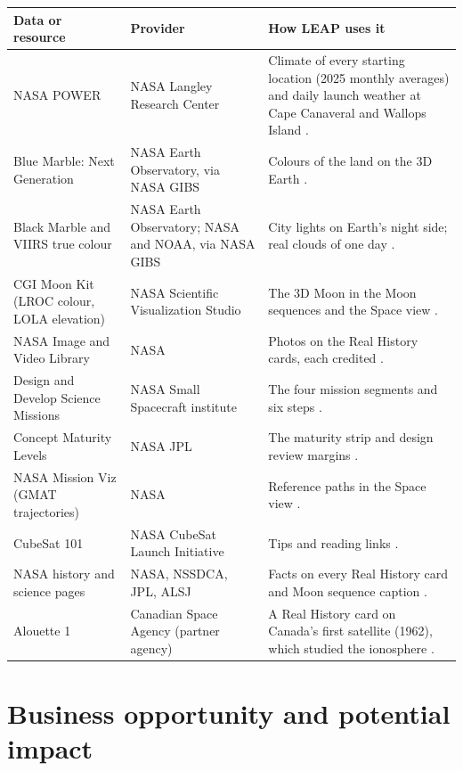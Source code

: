\documentclass[11pt,a4paper]{article}
\begin{document}
\begin{table}[H]
\centering\small
\begin{tabularx}{\textwidth}{@{}p{3.6cm} L L@{}}
\toprule
\textbf{Data or resource} & \textbf{Provider} & \textbf{How LEAP uses it} \\
\midrule
NASA POWER & NASA Langley Research Center & Climate of every starting location (2025 monthly averages) and daily launch weather at Cape Canaveral and Wallops Island \cite{power}. \\
Blue Marble: Next Generation & NASA Earth Observatory, via NASA GIBS & Colours of the land on the 3D Earth \cite{bluemarble, gibs}. \\
Black Marble and VIIRS true colour & NASA Earth Observatory; NASA and NOAA, via NASA GIBS & City lights on Earth's night side; real clouds of one day \cite{blackmarble, viirs}. \\
CGI Moon Kit (LROC colour, LOLA elevation) & NASA Scientific Visualization Studio & The 3D Moon in the Moon sequences and the Space view \cite{moonkit}. \\
NASA Image and Video Library & NASA & Photos on the Real History cards, each credited \cite{nasaimages}. \\
Design and Develop Science Missions & NASA Small Spacecraft institute & The four mission segments and six steps \cite{segments}. \\
Concept Maturity Levels & NASA JPL & The maturity strip and design review margins \cite{cml}. \\
NASA Mission Viz (GMAT trajectories) & NASA & Reference paths in the Space view \cite{missionviz}. \\
CubeSat 101 & NASA CubeSat Launch Initiative & Tips and reading links \cite{cubesat101}. \\
NASA history and science pages & NASA, NSSDCA, JPL, ALSJ & Facts on every Real History card and Moon sequence caption \cite{a11, sp4205, sp4029}. \\
Alouette 1 & Canadian Space Agency (partner agency) & A Real History card on Canada's first satellite (1962), which studied the ionosphere \cite{alouette}. \\
\bottomrule
\end{tabularx}
\end{table}

\section{Business opportunity and potential impact}
\end{document}
